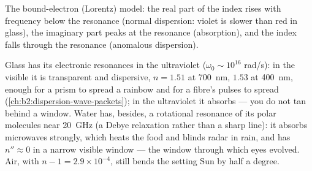 \begin{omfigure}

{\small The bound-electron (Lorentz) model: the real part of the index
rises with frequency below the resonance (normal dispersion: violet
is slower than red in glass), the imaginary part peaks at the
resonance (absorption), and the index falls through the resonance
(anomalous dispersion).}
\end{omfigure}

\begin{example}\label{ex:b2:waves-in-media:dielectrics}
Glass has its electronic resonances in the ultraviolet ($\omega_0 \sim 10^{16}$
rad/s): in the visible it is transparent and dispersive, $n = 1.51$ at
\qty{700}{nm}, $1.53$ at \qty{400}{nm}, enough for a prism to spread a
rainbow and for a fibre's pulses to spread (\cref{ch:b2:dispersion-wave-packets});
in the ultraviolet it absorbs --- you do not tan behind a window.
Water has, besides, a rotational resonance of its polar molecules near
\qty{20}{GHz} (a Debye relaxation rather than a sharp line): it absorbs
microwaves strongly, which heats the food and blinds radar in rain,
and has $n'' \approx 0$ in a narrow visible window --- the window through
which eyes evolved. Air, with $n - 1 = 2.9 \times 10^{-4}$, still bends the
setting Sun by half a degree.
\end{example}

